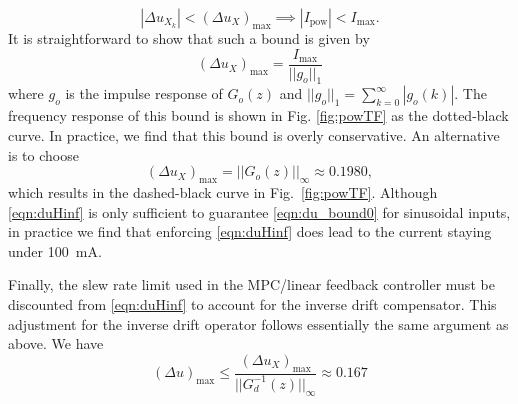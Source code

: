 \documentclass[twocolumn,twoside]{IEEEtran}
\begin{document}
\begin{equation}
  |\Delta u_{X_k}| < (\Delta u_X)_{\text{max}} \implies |I_{\text{pow}}| < I_{\text{max}}.\label{eqn:du_bound0}
\end{equation}
It is straightforward to show that such a bound is given by 
\begin{equation}
(\Delta u_X)_{\text{max}} = \frac{I_{\text{max}}}{||g_o||_1}\label{eqn:h1bound}
\end{equation}
where $g_o$ is the impulse response of $G_o(z)$ and ${||g_o||_1 = \sum_{k=0}^{\infty}|g_o(k)|}$. The frequency response of this bound is shown in Fig. \ref{fig:powTF} as the dotted-black curve. In practice, we find that this bound is overly conservative. An alternative is to choose
\begin{equation}
(\Delta u_X)_{\text{max}} = ||G_o(z)||_{\infty}\approx 0.1980, \label{eqn:duHinf}
\end{equation}
which results in the dashed-black curve in Fig.~\ref{fig:powTF}. Although \eqref{eqn:duHinf} is only sufficient to guarantee \eqref{eqn:du_bound0} for sinusoidal inputs, in practice we find that enforcing \eqref{eqn:duHinf} does lead to the current staying under 100~mA.


Finally, the slew rate limit used in the MPC/linear feedback controller must be discounted from \eqref{eqn:duHinf} to account for the inverse drift compensator. This adjustment for the inverse drift operator follows essentially the same argument as above. We have
\begin{equation}
  (\Delta u)_{\text{max}} \leq \frac{(\Delta u_X)_{\text{max}}}{||G^{-1}_d(z)||_{\infty}} \approx 0.167 \label{eqn:du_discount}
\end{equation}
\end{document}
